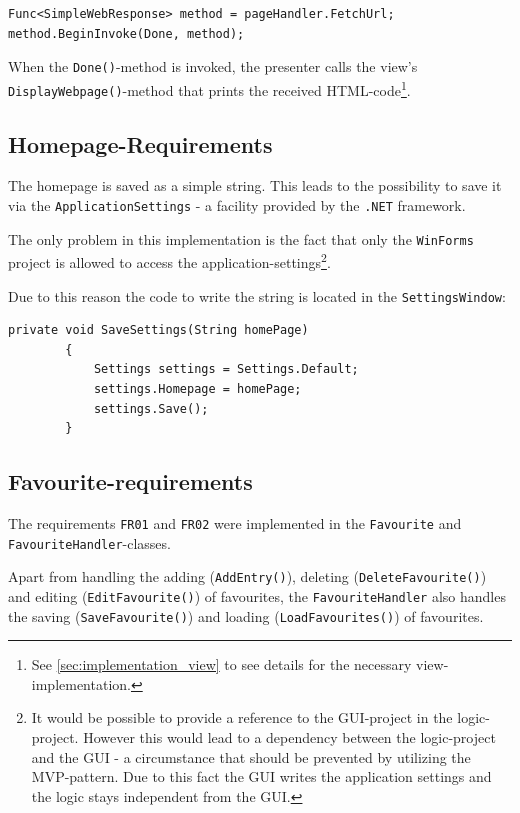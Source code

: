\begin{lstlisting}[caption=Fetching \ac{URL}s with error-codes]
Func<SimpleWebResponse> method = pageHandler.FetchUrl;
method.BeginInvoke(Done, method);
\end{lstlisting}

When the \texttt{Done()}-method is invoked, the presenter calls the view's \texttt{DisplayWebpage()}-method that prints the received \ac{HTML}-code\footnote{See \autoref{sec:implementation_view} to see details for the necessary view-implementation.}.

\subsection{Homepage-Requirements}

The homepage is saved as a simple string. This leads to the possibility to save it via the \texttt{ApplicationSettings} - a facility provided by the \texttt{.NET} framework.

The only problem in this implementation is the fact that only the \texttt{WinForms} project is allowed to access the application-settings\footnote{It would be possible to provide a reference to the \ac{GUI}-project in the logic-project. However this would lead to a dependency between the logic-project and the \ac{GUI} - a circumstance that should be prevented by utilizing the \ac{MVP}-pattern. Due to this fact the \ac{GUI} writes the application settings and the logic stays independent from the \ac{GUI}.}.

Due to this reason the code to write the string is located in the \texttt{SettingsWindow}:

\begin{lstlisting}
private void SaveSettings(String homePage)
        {
            Settings settings = Settings.Default;
            settings.Homepage = homePage;
            settings.Save();
        }
\end{lstlisting}

\subsection{Favourite-requirements}

The requirements \texttt{FR01} and \texttt{FR02} were implemented in the \texttt{Favourite} and \texttt{FavouriteHandler}-classes.

Apart from handling the adding (\texttt{AddEntry()}), deleting (\texttt{DeleteFavourite()}) and editing (\texttt{EditFavourite()}) of favourites, the \texttt{FavouriteHandler} also handles the saving (\texttt{SaveFavourite()}) and loading (\texttt{LoadFavourites()}) of favourites.

